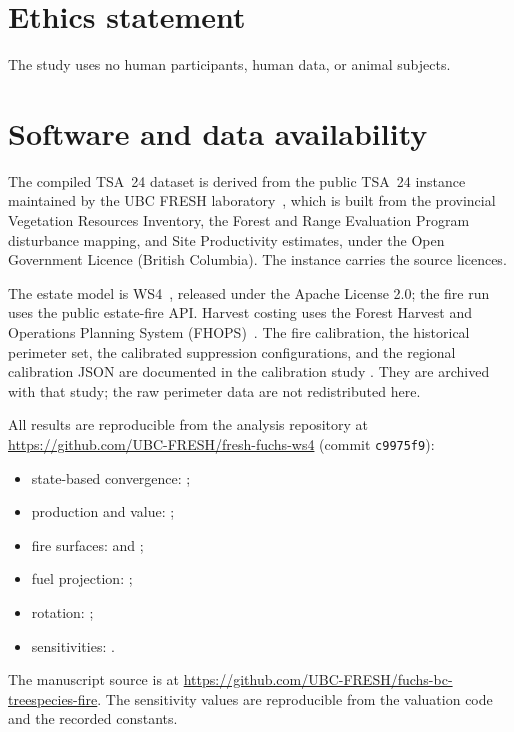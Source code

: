 \section*{Ethics statement}

The study uses no human participants, human data, or animal subjects.

\section*{Software and data availability}

The compiled TSA~24 dataset is derived from the public TSA~24 instance maintained by the UBC
FRESH laboratory~\citep{femic_tsa24_2026}, which is built from the provincial Vegetation Resources
Inventory, the Forest and Range Evaluation Program disturbance mapping, and Site Productivity
estimates, under the Open Government Licence (British Columbia). The instance carries the source licences.

The estate model is WS4~\citep{ubc_fresh_ws4_2026}, released under the Apache License 2.0; the
fire run uses the public estate-fire API. Harvest costing uses the Forest Harvest and Operations
Planning System (FHOPS)~\citep{fhops_2026}. The fire calibration, the historical perimeter set, the calibrated suppression
configurations, and the regional calibration JSON are documented in the calibration study
\citep{ubc_fresh_fire_calibration_2026}. They are archived with that study; the raw perimeter data
are not redistributed here.

All results are reproducible from the analysis repository at
\url{https://github.com/UBC-FRESH/fresh-fuchs-ws4} (commit \texttt{c9975f9}):
\begin{itemize}
\item state-based convergence: ;
\item production and value: ;
\item fire surfaces: 
and ;
\item fuel projection: ;
\item rotation: ;
\item sensitivities: .
\end{itemize}
The manuscript source is at \url{https://github.com/UBC-FRESH/fuchs-bc-treespecies-fire}. The
sensitivity values are reproducible from the valuation code and the recorded constants.

